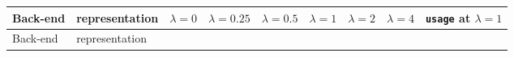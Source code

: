 \documentclass[authoryear,review,3p,times]{elsarticle}
\newcounter{none}
\begin{document}
{\def\LTcaptype{none} %
\begin{longtable}[]{@{}
  >{\raggedright\arraybackslash}p{}
  >{\raggedright\arraybackslash}p{}
  >{\raggedright\arraybackslash}p{}
  >{\raggedright\arraybackslash}p{}
  >{\raggedright\arraybackslash}p{}
  >{\raggedright\arraybackslash}p{}
  >{\raggedright\arraybackslash}p{}
  >{\raggedright\arraybackslash}p{}
  >{\raggedright\arraybackslash}p{}@{}}
\toprule\noalign{}
\begin{minipage}[b]{\linewidth}\raggedright
Back-end
\end{minipage} & \begin{minipage}[b]{\linewidth}\raggedright
representation
\end{minipage} & \begin{minipage}[b]{\linewidth}\raggedright
\(\lambda=0\)
\end{minipage} & \begin{minipage}[b]{\linewidth}\raggedright
\(\lambda=0.25\)
\end{minipage} & \begin{minipage}[b]{\linewidth}\raggedright
\(\lambda=0.5\)
\end{minipage} & \begin{minipage}[b]{\linewidth}\raggedright
\(\lambda=1\)
\end{minipage} & \begin{minipage}[b]{\linewidth}\raggedright
\(\lambda=2\)
\end{minipage} & \begin{minipage}[b]{\linewidth}\raggedright
\(\lambda=4\)
\end{minipage} & \begin{minipage}[b]{\linewidth}\raggedright
\texttt{usage} at \(\lambda=1\)
\end{minipage} \\
\midrule\noalign{}
\endfirsthead
\toprule\noalign{}
\begin{minipage}[b]{\linewidth}\raggedright
Back-end
\end{minipage} & \begin{minipage}[b]{\linewidth}\raggedright
representation

\end{minipage}
\end{longtable}}
\end{document}
